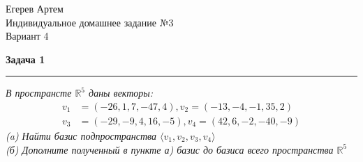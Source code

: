 \documentclass[10pt]{article}
\title{}
\date{Егерев Артем, БПМИ-167}
\author{Домашняя работа по дискретной математике 17}
\begin{document}
\begin{flushright}
	Егерев Артем \\
	Индивидуальное домашнее задание №3 \\
	Вариант 4
\end{flushright}
\textbf{\Large Задача 1}
\medskip\hrule\medskip
\textsl{В пространсте $\mathbb{R}^5$ даны векторы:}
\begin{align*}
v_1 &= (-26, 1, 7, -47, 4), v_2 =(-13, -4, -1, 35, 2) \\ v_3 &=(-29, -9, 4, 16, -5), v_4 =(42, 6, -2, -40, -9)
\end{align*}
\textsl{(a) Найти базис подпространства $\langle v_1, v_2, v_3, v_4 \rangle$ \\
(б) Дополните полученный в пункте а) базис до базиса всего пространства $\mathbb{R}^5$}  \\
\end{document}
